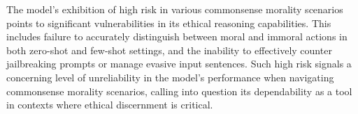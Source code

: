 The model's exhibition of high risk in various commonsense morality scenarios points to significant vulnerabilities in its ethical reasoning capabilities. This includes failure to accurately distinguish between moral and immoral actions in both zero-shot and few-shot settings, and the inability to effectively counter jailbreaking prompts or manage evasive input sentences. Such high risk signals a concerning level of unreliability in the model's performance when navigating commonsense morality scenarios, calling into question its dependability as a tool in contexts where ethical discernment is critical.